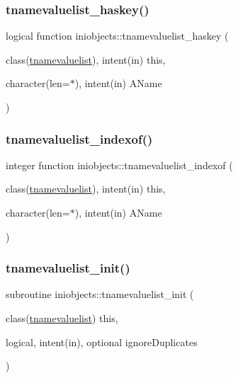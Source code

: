 \subsubsection{\texorpdfstring{tnamevaluelist\+\_\+haskey()}{tnamevaluelist\_haskey()}}
{\footnotesize\ttfamily logical function iniobjects\+::tnamevaluelist\+\_\+haskey (\begin{DoxyParamCaption}\item[{class(\mbox{\hyperlink{structiniobjects_1_1tnamevaluelist}{tnamevaluelist}}), intent(in)}]{this,  }\item[{character(len=$\ast$), intent(in)}]{A\+Name }\end{DoxyParamCaption})\hspace{0.3cm}{\ttfamily [private]}}

\mbox{\label{namespaceiniobjects_af6bb8b086a07d911f23b9d408dd89a2e}} 
\subsubsection{\texorpdfstring{tnamevaluelist\+\_\+indexof()}{tnamevaluelist\_indexof()}}
{\footnotesize\ttfamily integer function iniobjects\+::tnamevaluelist\+\_\+indexof (\begin{DoxyParamCaption}\item[{class(\mbox{\hyperlink{structiniobjects_1_1tnamevaluelist}{tnamevaluelist}}), intent(in)}]{this,  }\item[{character(len=$\ast$), intent(in)}]{A\+Name }\end{DoxyParamCaption})\hspace{0.3cm}{\ttfamily [private]}}

\mbox{\label{namespaceiniobjects_aaa5d8364fae58e251714849bb64e5124}} 
\subsubsection{\texorpdfstring{tnamevaluelist\+\_\+init()}{tnamevaluelist\_init()}}
{\footnotesize\ttfamily subroutine iniobjects\+::tnamevaluelist\+\_\+init (\begin{DoxyParamCaption}\item[{class(\mbox{\hyperlink{structiniobjects_1_1tnamevaluelist}{tnamevaluelist}})}]{this,  }\item[{logical, intent(in), optional}]{ignore\+Duplicates }\end{DoxyParamCaption})\hspace{0.3cm}{\ttfamily [private]}}




